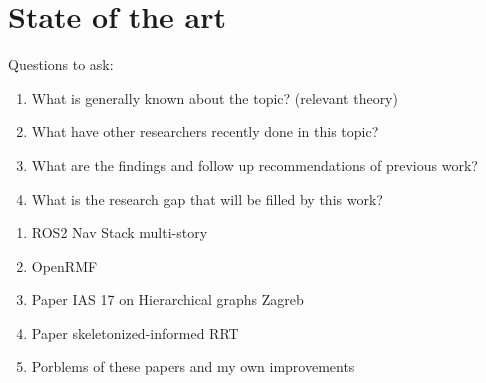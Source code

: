 \chapter{State of the art}
\label{sec:state_of_the_art}
Questions to ask:
\begin{enumerate}
    \item What is generally known about the topic? (relevant theory)
    \item What have other researchers recently done in this topic?
    \item What are the findings and follow up recommendations of previous work?
    \item What is the research gap that will be filled by this work?
\end{enumerate}

\begin{enumerate}
    \item ROS2 Nav Stack multi-story
    \item OpenRMF
    \item Paper IAS 17 on Hierarchical graphs Zagreb
    \item Paper skeletonized-informed RRT
    \item Porblems of these papers and my own improvements
\end{enumerate}